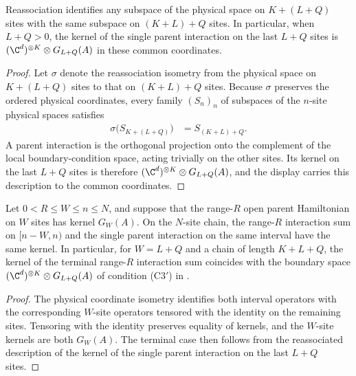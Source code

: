 \begin{lemma}
    \label{thm:ph_reassociated_suffix_kernel}
    \leanok
    Reassociation identifies any subspace of the physical space on
    $K+(L+Q)$ sites with the same subspace on $(K+L)+Q$ sites.
    In particular, when $L+Q>0$, the kernel of the single parent interaction
    on the last $L+Q$ sites is
    $(\C^d)^{\otimes K}\otimes G_{L+Q}(A)$ in these common coordinates.
\end{lemma}
\begin{proof}
    \leanok
    Let $\sigma$ denote the reassociation isometry from the physical space
    on $K+(L+Q)$ sites to that on $(K+L)+Q$ sites. Because $\sigma$ preserves
    the ordered physical coordinates, every family $(S_n)_n$ of subspaces of
    the $n$-site physical spaces satisfies
    \begin{align}
        \sigma\bigl(S_{K+(L+Q)}\bigr) & = S_{(K+L)+Q}.
    \end{align}
    A parent interaction is the orthogonal projection onto the complement
    of the local boundary-condition space, acting trivially on the other
    sites. Its kernel on the last $L+Q$ sites is therefore
    $(\C^d)^{\otimes K}\otimes G_{L+Q}(A)$, and the display carries this
    description to the common coordinates.
\end{proof}

\begin{lemma}
    \label{thm:ph_terminal_interval_kernel}
    \leanok
    Let $0<R\leq W\leq n\leq N$, and suppose that the range-$R$ open parent
    Hamiltonian on $W$ sites has kernel $G_W(A)$. On the $N$-site chain,
    the range-$R$ interaction sum on $[n-W,n)$ and the single parent
    interaction on the same interval have the same kernel. In particular,
    for $W=L+Q$ and a chain of length $K+L+Q$, the kernel of the terminal
    range-$R$ interaction sum coincides with the boundary space
    $(\C^d)^{\otimes K}\otimes G_{L+Q}(A)$ of condition (C3$'$) in
    \cite{Nachtergaele1996Spectral}.
\end{lemma}
\begin{proof}
    \leanok
    The physical coordinate isometry identifies both interval operators
    with the corresponding $W$-site operators tensored with the identity on
    the remaining sites. Tensoring with the identity preserves equality of
    kernels, and the $W$-site kernels are both $G_W(A)$. The terminal case
    then follows from the reassociated description of the kernel of the
    single parent interaction on the last $L+Q$ sites.
\end{proof}

